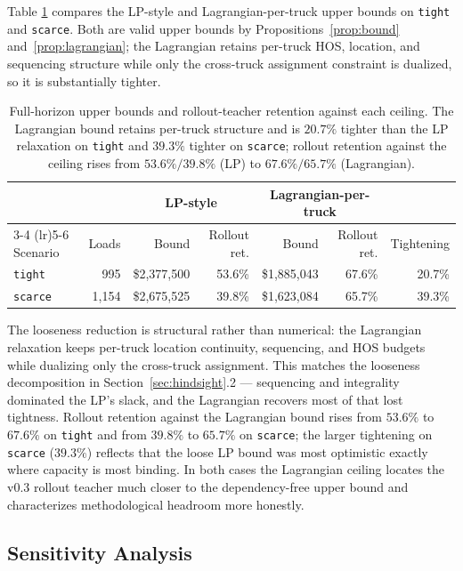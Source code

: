 \documentclass[11pt]{article}
\begin{document}
Table \ref{tab:bound} compares the LP-style and Lagrangian-per-truck
upper bounds on \texttt{tight} and \texttt{scarce}. Both are valid upper
bounds by Propositions~\ref{prop:bound} and~\ref{prop:lagrangian}; the
Lagrangian retains per-truck HOS, location, and sequencing structure
while only the cross-truck assignment constraint is dualized, so it is
substantially tighter.

\begin{table}[t]
\centering
\caption{Full-horizon upper bounds and rollout-teacher retention against
each ceiling. The Lagrangian bound retains per-truck structure and is
$20.7\%$ tighter than the LP relaxation on \texttt{tight} and $39.3\%$
tighter on \texttt{scarce}; rollout retention against the ceiling rises
from $53.6\%/39.8\%$ (LP) to $67.6\%/65.7\%$ (Lagrangian).}
\label{tab:bound}
\small
\begin{tabular}{lrrrrrr}
\toprule
& & \multicolumn{2}{c}{LP-style} & \multicolumn{2}{c}{Lagrangian-per-truck} & \\
\cmidrule(lr){3-4} \cmidrule(lr){5-6}
Scenario & Loads & Bound & Rollout ret. & Bound & Rollout ret. & Tightening \\
\midrule
\texttt{tight}  &  995 & \$2{,}377{,}500 & 53.6\% & \$1{,}885{,}043 & 67.6\% & 20.7\% \\
\texttt{scarce} & 1{,}154 & \$2{,}675{,}525 & 39.8\% & \$1{,}623{,}084 & 65.7\% & 39.3\% \\
\bottomrule
\end{tabular}
\end{table}

The looseness reduction is structural rather than numerical: the
Lagrangian relaxation keeps per-truck location continuity, sequencing,
and HOS budgets while dualizing only the cross-truck assignment. This
matches the looseness decomposition in Section~\ref{sec:hindsight}.2 ---
sequencing and integrality dominated the LP's slack, and the Lagrangian
recovers most of that lost tightness. Rollout retention against the
Lagrangian bound rises from $53.6\%$ to $67.6\%$ on \texttt{tight} and
from $39.8\%$ to $65.7\%$ on \texttt{scarce}; the larger tightening on
\texttt{scarce} ($39.3\%$) reflects that the loose LP bound was most
optimistic exactly where capacity is most binding. In both cases the
Lagrangian ceiling locates the v0.3 rollout teacher much closer to the
dependency-free upper bound and characterizes methodological headroom
more honestly.

\subsection{Sensitivity Analysis}
\end{document}
